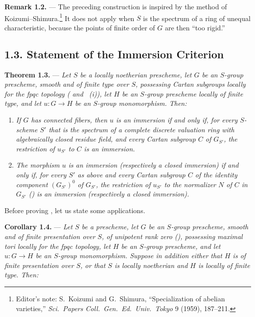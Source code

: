 \medskip
\noindent{}%
\textbf{Remark 1.2.} --- The preceding construction is inspired by
the method of Koizumi--Shimura.\footnote{Editor's note:
S.~Koizumi and G.~Shimura, ``Specialization of abelian varieties,''
\emph{Sci.\ Papers Coll.\ Gen.\ Ed.\ Univ.\ Tokyo} 9 (1959),
187--211.} It does not apply when \(S\) is the spectrum of a ring of
unequal characteristic, because the points of finite order of \(G\)
are then ``too rigid.''

%
\subsection*{1.3. Statement of the Immersion Criterion}

\medskip
\noindent{}%
\textbf{Theorem 1.3.} --- \textit{Let \(S\) be a locally noetherian
prescheme, let \(G\) be an \(S\)-group prescheme, smooth and of finite
type over \(S\), possessing Cartan subgroups locally for the fpqc
topology ( and ~(i)), let \(H\) be an \(S\)-group
prescheme locally of finite type, and let \(u:G\to H\) be an
\(S\)-group monomorphism. Then:}

\begin{enumerate}
\item[\textit{a)}] \textit{If \(G\) has connected fibers, then \(u\)
is an immersion if and only if, for every \(S\)-scheme \(S'\) that is
the spectrum of a complete discrete valuation ring with algebraically
closed residue field, and every Cartan subgroup \(C\) of \(G_{S'}\),
the restriction of \(u_{S'}\) to \(C\) is an immersion.}

\item[\textit{b)}] \textit{The morphism \(u\) is an immersion
(respectively a closed immersion) if and only if, for every \(S'\) as
above and every Cartan subgroup \(C\) of the identity component
\((G_{S'})^0\) of \(G_{S'}\), the restriction of \(u_{S'}\) to the
normalizer \(N\) of \(C\) in \(G_{S'}\) () is an
immersion (respectively a closed immersion).}
\end{enumerate}

Before proving , let us state some applications.

\medskip
\noindent{}%
\textbf{Corollary 1.4.} --- \textit{Let \(S\) be a prescheme, let
\(G\) be an \(S\)-group prescheme, smooth and of finite presentation
over \(S\), of unipotent rank zero (), possessing
maximal tori locally for the fpqc topology, let \(H\) be an
\(S\)-group prescheme, and let \(u:G\to H\) be an \(S\)-group
monomorphism. Suppose in addition either that \(H\) is of finite
presentation over \(S\), or that \(S\) is locally noetherian and
\(H\) is locally of finite type. Then:}

